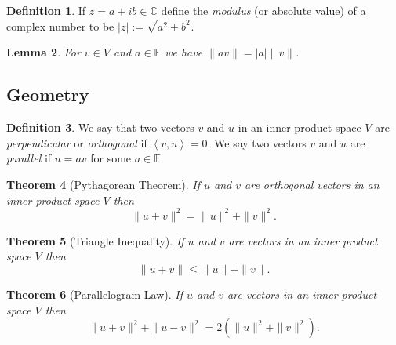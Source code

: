 \documentclass[12pt,letterpaper]{article}
\newcommand{\ip}[2]{\left\langle {#1}, {#2}\right\rangle}
\theoremstyle{plain}
\newtheorem{theorem}{Theorem}[section]
\newtheorem{lemma}[theorem]{Lemma}
\theoremstyle{definition}
\newtheorem{definition}[theorem]{Definition}
\numberwithin{equation}{section}
\begin{document}
\begin{definition} If $z=a+ib\in \mathbb{C}$ define the \emph{modulus} (or absolute value) of a complex number to be $|z|:=\sqrt{a^2+b^2}$.
\end{definition}

\begin{lemma} For $v\in V$ and $a\in \mathbb{F}$ we have $\|av\|=|a|\|v\|$. 
\end{lemma}

\subsection{Geometry}
\begin{definition} We say that two vectors $v$ and $u$ in an inner product space $V$ are \emph{perpendicular} or \emph{orthogonal} if $\ip{v}{u}=0$. We say two vectors $v$ and $u$ are \emph{parallel} if $u=av$ for some $a\in \mathbb{F}$. 
\end{definition}
\begin{theorem}[Pythagorean Theorem] 
If $u$ and $v$ are orthogonal vectors in an inner product space $V$ then \[\|u+v\|^2=\|u\|^2+\|v\|^2.\] 
\end{theorem}

\begin{theorem}[Triangle Inequality] 
If $u$ and $v$ are vectors in an inner product space $V$ then \[\|u+v\|\leq \|u\|+\|v\|.\] 
\end{theorem}

\begin{theorem}[Parallelogram Law] 
If $u$ and $v$ are vectors in an inner product space $V$ then \[\|u+v\|^2+\|u-v\|^2= 2(\|u\|^2+\|v\|^2).\] 
\end{theorem}
\end{document}
